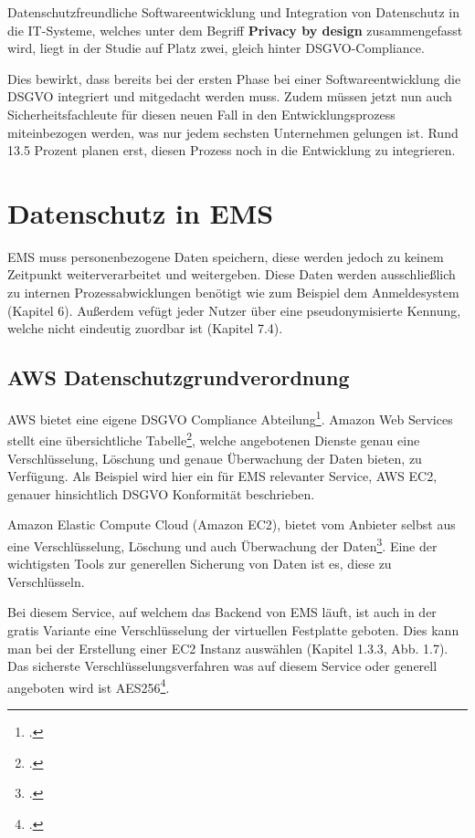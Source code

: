 Datenschutzfreundliche Softwareentwicklung und Integration von Datenschutz in die IT-Systeme, welches unter dem Begriff \textbf{Privacy by design} zusammengefasst wird, liegt in der Studie auf Platz zwei, gleich hinter DSGVO-Compliance. 

Dies bewirkt, dass bereits bei der ersten Phase bei einer Softwareentwicklung die DSGVO integriert und mitgedacht werden muss. Zudem müssen jetzt nun auch Sicherheitsfachleute für diesen neuen Fall in den Entwicklungsprozess miteinbezogen werden, was nur jedem sechsten Unternehmen gelungen ist. Rund 13.5 Prozent planen erst, diesen Prozess noch in die Entwicklung zu integrieren.

\section{Datenschutz in EMS}
EMS muss personenbezogene Daten speichern, diese werden jedoch zu keinem Zeitpunkt weiterverarbeitet und weitergeben. Diese Daten werden ausschließlich zu internen Prozessabwicklungen benötigt wie zum Beispiel dem
Anmeldesystem (Kapitel 6). Außerdem vefügt jeder Nutzer über eine pseudonymisierte Kennung, welche nicht eindeutig zuordbar ist (Kapitel 7.4).

\subsection{AWS Datenschutzgrundverordnung}
AWS bietet eine eigene DSGVO Compliance Abteilung\footcite{aws-dsgvo}. Amazon Web Services stellt eine übersichtliche Tabelle\footcite{AWS-DSGVO-Tabelle}, welche angebotenen Dienste genau eine Verschlüsselung, Löschung und 
genaue Überwachung der Daten bieten, zu Verfügung. Als Beispiel wird hier ein für EMS relevanter Service, AWS EC2, genauer hinsichtlich DSGVO Konformität beschrieben.

Amazon Elastic Compute Cloud (Amazon EC2), bietet vom Anbieter selbst aus eine Verschlüsselung, Löschung und auch Überwachung der Daten\footcite{aws-ec2-dsgvo-alles}. Eine der wichtigsten Tools zur generellen Sicherung von Daten ist es, diese zu
Verschlüsseln.

Bei diesem Service, auf welchem das Backend von EMS läuft, ist auch in der gratis Variante eine Verschlüsselung der virtuellen Festplatte geboten. Dies kann man bei der Erstellung einer EC2 Instanz auswählen
(Kapitel 1.3.3, Abb. 1.7). Das sicherste Verschlüsselungsverfahren was auf diesem Service oder generell angeboten wird ist AES256\footcite{aes256}.

